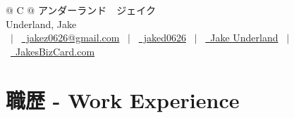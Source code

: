 \documentclass[uplatex,dvipdfmx,a4paper,11pt]{jsarticle}
\begin{document}
\pagestyle{empty} 



\begin{tabularx}{\linewidth}{@{} C @{}}
\Huge{アンダーランド　ジェイク} \\
Underland, Jake\\[1pt]
 \ $|$ \ 
\href{mailto:jakez0626@gmail.com}{\raisebox{-0.05\height}\faEnvelope \ jakez0626@gmail.com} \ $|$ \ 
\href{https://github.com/jaked0626}{\raisebox{-0.05\height}\faGithub\ jaked0626} \ $|$ \ 
\href{https://linkedin.com/in/jake-underland-720126201/}{\raisebox{-0.05\height}\faLinkedin\ Jake Underland} \ $|$ \ 
\href{https://jaked0626.github.io/digital-biz-card/}{\raisebox{-0.05\height}\faGlobe \ JakesBizCard.com} \\
\end{tabularx}



\section{職歴 - Work Experience}
\end{document}
